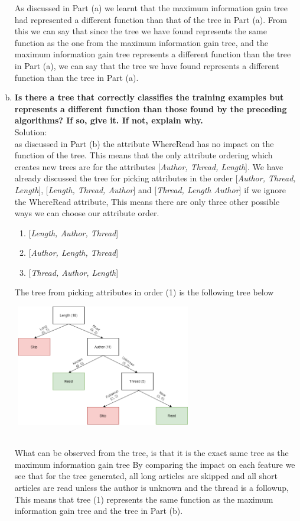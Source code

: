 \documentclass{article}
\begin{document}
\begin{enumerate}[(a)]
As discussed in Part (a) we learnt that the maximum information gain tree had represented a different function than that of the tree in Part (a). From this we can say that since the tree we have found represents the same function as the one from the maximum information gain tree, and the maximum information gain tree represents a different function than the tree in Part (a), we can say that the tree we have found represents a different function than the tree in Part (a).
\newpage
\item \textbf{Is there a tree that correctly classifies the training examples but represents a different function than those found by the preceding algorithms? If so, give it. If not, explain why.}\\Solution:\\
as discussed in Part (b) the attribute WhereRead has no impact on the function of the tree. This means that the only attribute ordering which creates new trees are for the attributes [\emph{Author, Thread, Length}]. We have already discussed the tree for picking attributes in the order [\emph{Author, Thread, Length}], [\emph{Length, Thread, Author}] and [\emph{Thread, Length Author}] if  we ignore the WhereRead attribute, This means there are only three other possible ways we can choose our attribute order.
    \begin{enumerate}[(1)]
        \item{[\emph{Length, Author, Thread}]}
        \item{[\emph{Author, Length, Thread}]}
        \item{[\emph{Thread, Author, Length}]}
    \end{enumerate}
The tree from picking attributes in order (1) is the following tree below
\begin{center}
\includegraphics[width=300px,height=200px]{tree3.png}
\end{center}\\
What can be observed from the tree, is that it is the exact same tree as the maximum information gain tree By comparing the impact on each feature we see that for the  tree generated, all long articles are skipped and all short articles are read unless the author is unknown and the thread is a followup, This means that tree (1) represents the same function as the maximum information gain tree and the tree in Part (b).\\

\end{enumerate}
\end{document}
